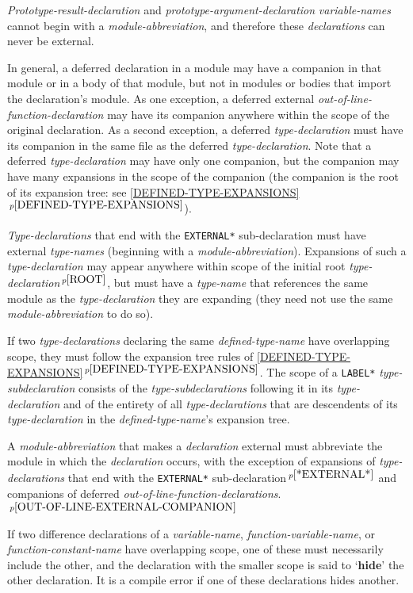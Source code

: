 \documentclass[12pt]{article}
\newcommand{\key}[1]{{\rm \bfseries #1}}
\newcommand{\itemref}[1]{\ref{#1}$\,^{p\pageref{#1}}$}
\newcommand{\pagnote}[1]{$\,^{p\pageref{#1}}$}
\begin{document}
{\em Prototype-result-declaration} and {\em prototype-argument-declaration}
{\em variable-names} cannot begin with a {\em module-abbreviation},
and therefore these {\em declarations} can never be external.

In general, a deferred declaration
in a module may have a companion in that module
or in a body of that module, but not in modules or bodies that import
the declaration's module.
As one exception, a deferred external {\em out-of-line-function-declaration}
may have its companion
anywhere within the scope of the original declaration.
As a second exception, a deferred {\em type-declaration} must have its
companion in the same file as the deferred {\em type-declaration}.
Note that a deferred {\em type-declaration} may have only one
companion, but the companion may have many expansions in the
scope of the companion (the companion is the root of its expansion tree:
see \itemref{DEFINED-TYPE-EXPANSIONS}).

{\em Type-declarations} that end with the {\tt *EXTERNAL*}
sub-declaration must have external {\em type-names}
(beginning with a {\em module-abbreviation}).
Expansions of such a {\em type-declaration} may appear
anywhere within scope of the initial root {\em type-declaration}\pagnote{ROOT},
but must have a {\em type-name} that references the same module
as the {\em type-declaration} they are expanding (they need not use the same
{\em module-abbreviation} to do so).

If two {\em type-declarations} declaring the same {\em defined-type-name}
have overlapping scope, they must follow the expansion tree rules
of \itemref{DEFINED-TYPE-EXPANSIONS}.
The scope of a {\tt *LABEL*} {\em type-subdeclaration}
consists of the {\em type-subdeclarations} following it in its
{\em type-declaration} and of the entirety of all
{\em type-declarations} that are descendents
of its {\em type-declaration} in the {\em defined-type-name}'s
expansion tree.

A {\em module-abbreviation} that makes a {\em declaration} external
must abbreviate the module in which the {\em declaration} occurs,
with the exception of expansions of {\em type-declar\-ations}
that end with the {\tt *EXTERNAL*} sub-declaration\pagnote{*EXTERNAL*}
and companions of deferred
{\em out-of-line-function-declarations}.\pagnote{OUT-OF-LINE-EXTERNAL-COMPANION}

If two difference declarations of a {\em variable-name},
{\em function-variable-name}, or {\em function-con\-stant-name}
have overlapping
scope, one of these must necessarily include the other,
and the declaration with the smaller scope is said to
`\key{hide}'\label{HIDE} the other declaration.
It is a compile error if one of these declarations hides another.
\end{document}
